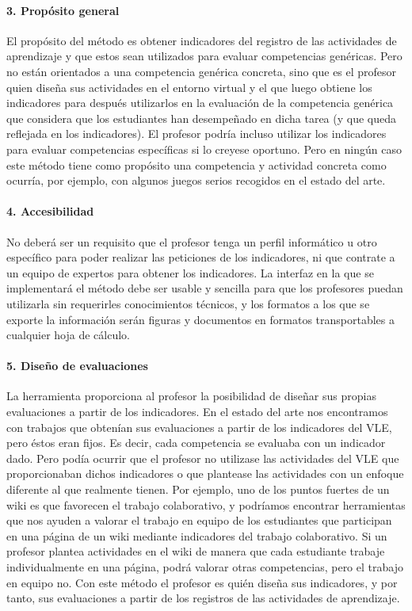\paragraph*{3. Propósito general}

El propósito del método es obtener indicadores del registro de las actividades de aprendizaje y que estos sean utilizados para evaluar competencias genéricas. Pero no están orientados a una competencia genérica concreta, sino que es el profesor quien diseña sus actividades en el entorno virtual y el que luego obtiene los indicadores para después utilizarlos en la evaluación de la competencia genérica que considera que los estudiantes han desempeñado en dicha tarea (y que queda reflejada en los indicadores). El profesor podría incluso utilizar los indicadores para evaluar competencias específicas si lo creyese oportuno. Pero en ningún caso este método tiene como propósito una competencia y actividad concreta como ocurría, por ejemplo, con algunos juegos serios recogidos en el estado del arte.

\paragraph*{4. Accesibilidad}

No deberá ser un requisito que el profesor tenga un perfil informático u otro específico para poder realizar las peticiones de los indicadores, ni que contrate a un equipo de expertos para obtener los indicadores. La interfaz en la que se implementará el método debe ser usable y sencilla para que los profesores puedan utilizarla sin requerirles conocimientos técnicos, y los formatos a los que se exporte la información serán figuras y documentos en formatos transportables a cualquier hoja de cálculo.

\paragraph*{5. Diseño de evaluaciones}

La herramienta proporciona al profesor la posibilidad de diseñar sus propias evaluaciones a partir de los indicadores. En el estado del arte nos encontramos con trabajos que obtenían sus evaluaciones a partir de los indicadores del VLE, pero éstos eran fijos. Es decir, cada competencia se evaluaba con un indicador dado. Pero podía ocurrir que el profesor no utilizase las actividades del VLE que proporcionaban dichos indicadores o que plantease las actividades con un enfoque diferente al que realmente tienen. Por ejemplo, uno de los puntos fuertes de un wiki es que favorecen el trabajo colaborativo, y podríamos encontrar herramientas que nos ayuden a valorar el trabajo en equipo de los estudiantes que participan en una página de un wiki mediante indicadores del trabajo colaborativo. Si un profesor plantea actividades en el wiki de manera que cada estudiante trabaje individualmente en una página, podrá valorar otras competencias, pero el trabajo en equipo no. Con este método el profesor es quién diseña sus indicadores, y por tanto, sus evaluaciones a partir de los registros de las actividades de aprendizaje.

